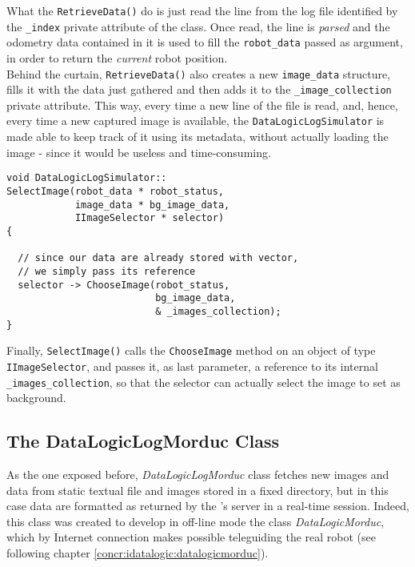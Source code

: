 What the \texttt{RetrieveData()} do is just read the line from the log 
file identified by the \texttt{\_index} private attribute of the class.
Once read, the line is \textit{parsed} and the odometry data contained 
in it is used to fill the \texttt{robot\_data} passed as argument, in 
order to return the \textit{current} robot position.
\\
Behind the curtain, \texttt{RetrieveData()} also creates a new 
\texttt{image\_data} structure, fills it with the data just 
gathered and then adds it to the \texttt{\_image\_collection} 
private attribute.
This way, every time a new line of the file is read, and, hence, 
every time a new captured image is available, the \texttt{DataLogicLogSimulator} 
is made able to keep track of it using its metadata, without actually 
loading the image - since it would be useless and time-consuming.

\begin{lstlisting}[caption={\texttt{DataLogic::SelectImage()} method}, label={code:selectimage_method}, frame=trBL]
void DataLogicLogSimulator::
SelectImage(robot_data * robot_status,
            image_data * bg_image_data,
            IImageSelector * selector)
{

  // since our data are already stored with vector,
  // we simply pass its reference
  selector -> ChooseImage(robot_status, 
                          bg_image_data, 
                          & _images_collection);
}
\end{lstlisting}

Finally, \texttt{SelectImage()} calls the \texttt{ChooseImage} method 
on an object of type \texttt{IImageSelector}, and passes it, as last 
parameter, a reference to its internal \texttt{\_images\_collection}, 
so that the selector can actually select the image to set as 
background.


\subsection{The DataLogicLogMorduc Class}
\label{concr:idatalogic:datalogiclogmorduc}

As the one exposed before, \textit{DataLogicLogMorduc} class
fetches new images and data from static textual file and images
stored in a fixed directory, but in this case data are formatted
as returned by the \morduc{}'s server in a real-time session. Indeed,
this class was created to develop in off-line mode the class
\textit{DataLogicMorduc}, which by Internet connection makes possible
teleguiding the real robot (see following chapter
\ref{concr:idatalogic:datalogicmorduc}).

